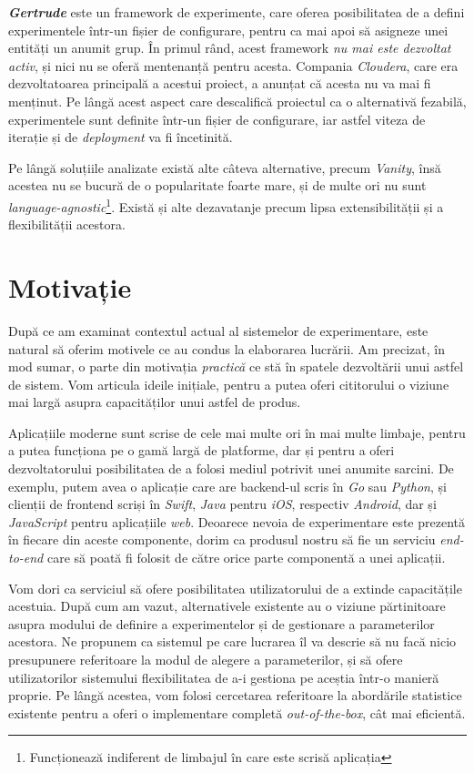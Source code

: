 \textbf{\textit{Gertrude}} este un framework de experimente, care oferea posibilitatea de a defini experimentele într-un fișier de configurare, pentru ca mai apoi să asigneze unei entități un anumit grup. În primul rând, acest framework \textit{nu mai este dezvoltat activ}, și nici nu se oferă mentenanță pentru acesta. Compania \textit{Cloudera}, care era dezvoltatoarea principală a acestui proiect, a anunțat că acesta nu va mai fi menținut. Pe lângă acest aspect care descalifică proiectul ca o alternativă fezabilă, experimentele sunt definite într-un fișier de configurare, iar astfel viteza de iterație și de \textit{deployment} va fi încetinită. 

Pe lângă soluțiile analizate există alte câteva alternative, precum \textit{Vanity}, însă acestea nu se bucură de o popularitate foarte mare, și de multe ori nu sunt \textit{language-agnostic}\footnote{Funcționează indiferent de limbajul în care este scrisă aplicația}. Există și alte dezavatanje precum lipsa extensibilității și a flexibilității acestora.

\section{Motivație}

După ce am examinat contextul actual al sistemelor de experimentare, este natural să oferim motivele ce au condus la elaborarea lucrării. Am precizat, în mod sumar, o parte din motivația \textit{practică} ce stă în spatele dezvoltării unui astfel de sistem. Vom articula ideile inițiale, pentru a putea oferi cititorului o viziune mai largă asupra capacităților unui astfel de produs.

Aplicațiile moderne sunt scrise de cele mai multe ori în mai multe limbaje, pentru a putea funcționa pe o gamă largă de platforme, dar și pentru a oferi dezvoltatorului posibilitatea de a folosi mediul potrivit unei anumite sarcini. De exemplu, putem avea o aplicație care are backend-ul scris în \textit{Go} sau \textit{Python}, și clienții de frontend scriși în \textit{Swift}, \textit{Java} pentru \textit{iOS}, respectiv \textit{Android}, dar și \textit{JavaScript} pentru aplicațiile \textit{web}. Deoarece nevoia de experimentare este prezentă în fiecare din aceste componente, dorim ca produsul nostru să fie un serviciu \textit{end-to-end} care să poată fi folosit de către orice parte componentă a unei aplicații. 

Vom dori ca serviciul să ofere posibilitatea utilizatorului de a extinde capacitățile acestuia. După cum am vazut, alternativele existente au o viziune părtinitoare asupra modului de definire a experimentelor și de gestionare a parameterilor acestora. Ne propunem ca sistemul pe care lucrarea îl va descrie să nu facă nicio presupunere referitoare la modul de alegere a parameterilor, și să ofere utilizatorilor sistemului flexibilitatea de a-i gestiona pe aceștia într-o manieră proprie. Pe lângă acestea, vom folosi cercetarea referitoare la abordările statistice existente pentru a oferi o implementare completă \textit{out-of-the-box}, cât mai eficientă.

